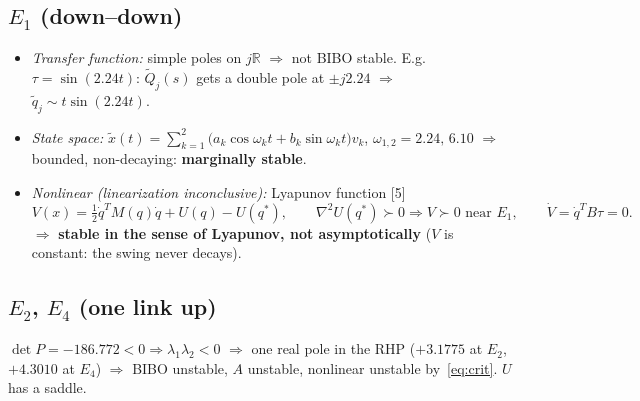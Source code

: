 \documentclass[10pt,letterpaper]{article}
\newenvironment{keep}{\par\noindent\begin{minipage}{\linewidth}}{\end{minipage}\par\smallskip}
\begin{document}
\begin{keep}
\subsection{$E_1$ (down--down)}
\begin{itemize}
\item \textit{Transfer function:} simple poles on $j\mathbb R$ $\Rightarrow$ not BIBO stable. E.g.\ $\tau=\sin(2.24t)$: $\tilde Q_j(s)$ gets a double pole at $\pm j2.24$ $\Rightarrow$ $\tilde q_j\sim t\sin(2.24t)$.
\item \textit{State space:} $\tilde x(t)=\sum_{k=1}^{2}\big(a_k\cos\omega_kt+b_k\sin\omega_kt\big)v_k$, $\omega_{1,2}=2.24,\,6.10$ $\Rightarrow$ bounded, non-decaying: \textbf{marginally stable}.
\item \textit{Nonlinear (linearization inconclusive):} Lyapunov function [5]
\begin{equation}
V(x)=\tfrac12\dot q^TM(q)\dot q+U(q)-U(q^*),\qquad
\nabla^2U(q^*)\succ0\Rightarrow V\succ0\text{ near }E_1,\qquad
\dot V=\dot q^TB\tau=0 .\label{eq:lyap}
\end{equation}
$\Rightarrow$ \textbf{stable in the sense of Lyapunov, not asymptotically} ($V$ is constant: the swing never decays).
\end{itemize}
\end{keep}

\begin{keep}
\subsection{$E_2$, $E_4$ (one link up)}
$\det P=-186.772<0\Rightarrow\lambda_1\lambda_2<0$ $\Rightarrow$ one real pole in the RHP ($+3.1775$ at $E_2$, $+4.3010$ at $E_4$) $\Rightarrow$ BIBO unstable, $A$ unstable, nonlinear unstable by~\eqref{eq:crit}. $U$ has a saddle.
\end{keep}
\end{document}
